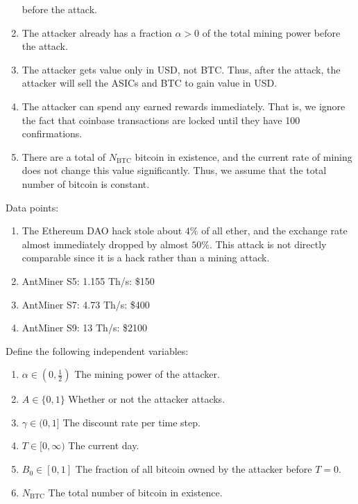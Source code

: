 \documentclass[12pt]{article}
\newcommand*{\Attack}{A}
\newcommand*{\Time}{T}
\newcommand*{\ABtcOrig}{{B_0}}
\newcommand*{\NumBtc}{{N_{\mathrm{BTC}}}}
\newenvironment{defs}
  { \begin{enumerate}[labelindent=0pt,labelwidth=2.5in,itemindent=0em,align=parleft,leftmargin=!] }
  { \end{enumerate} }
\begin{document}
\begin{enumerate}
    before the attack.
  \item
    The attacker already has a fraction $\alpha > 0$ of the total mining power
    before the attack.
  \item
    The attacker gets value only in USD, not BTC. Thus, after the attack, the
    attacker will sell the ASICs and BTC to gain value in USD.
  \item
    The attacker can spend any earned rewards immediately. That is, we ignore
    the fact that coinbase transactions are locked until they have 100
    confirmations.
  \item
    There are a total of $\NumBtc$ bitcoin in existence, and the current rate
    of mining does not change this value significantly. Thus, we assume that
    the total number of bitcoin is constant.
\end{enumerate}

Data points:

\begin{enumerate}
  \item
    The Ethereum DAO hack stole about $4\%$ of all ether, and the exchange rate
    almost immediately dropped by almost $50\%$.
    This attack is not directly comparable since it is a hack rather than a
    mining attack.
  \item
    AntMiner S5: 1.155 Th/s: \$150
  \item
    AntMiner S7: 4.73 Th/s: \$400
  \item
    AntMiner S9: 13 Th/s: \$2100
\end{enumerate}

Define the following independent variables:

\begin{defs}
  \item[{$\alpha \in (0, \frac{1}{2})$}]
    The mining power of the attacker.
  \item[{$\Attack \in \{0, 1\}$}]
    Whether or not the attacker attacks.
  \item[{$\gamma \in (0, 1]$}]
    The discount rate per time step.
  \item[{$\Time \in [0, \infty)$}]
    The current day.
  \item[{$\ABtcOrig \in [0, 1]$}]
    The fraction of all bitcoin owned by the attacker before $T = 0$.
  \item[{$\NumBtc$}]
    The total number of bitcoin in existence.
\end{defs}
\end{document}
